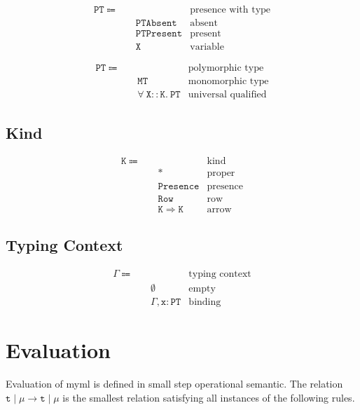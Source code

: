 \documentclass{report}
\newcommand{\theLang}{myml}
\newcommand{\code}{\mathtt}
\begin{document}
\begin{align*}
\code{PT} \Coloneqq \quad & & \text{presence with type} \\
& \code{PTAbsent} & \text{absent} \\
& \code{PTPresent} & \text{present} \\
& \code{X} & \text{variable}
\end{align*}

\begin{align*}
\code{PT} \Coloneqq\quad & & \text{polymorphic type} \\
& \code{MT} & \text{monomorphic type} \\
& \code{\forall\ X :: K.\ PT} & \text{universal qualified}
\end{align*}

\subsection{Kind}

\begin{align*}
\code{K} \Coloneqq \quad & & \text{kind} \\
& \code{*} & \text{proper} \\
& \code{Presence} & \text{presence} \\
& \code{Row} & \text{row} \\
& \code{K \Rightarrow K} & \text{arrow}
\end{align*}

\subsection{Typing Context}

\begin{align*}
\Gamma \Coloneqq \quad & & \text{typing context} \\
& \code{\emptyset} & \text{empty} \\
& \code{\Gamma, \code{x}:\code{PT}} & \text{binding}
\end{align*}

\section{Evaluation}

Evaluation of \theLang{} is defined in small step operational semantic. The relation \(\code{t}\mid\mu \longrightarrow \code{t}\mid\mu\) is the smallest relation satisfying all instances of the following rules.
\end{document}
